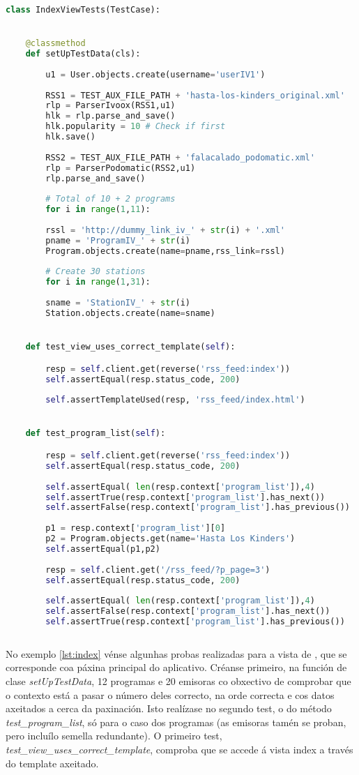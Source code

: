 \begin{lstlisting}[language=Python, caption=Fragmento das probas da vista index, label=lst:index]
class IndexViewTests(TestCase):


	@classmethod
	def setUpTestData(cls):
	
		u1 = User.objects.create(username='userIV1')
		
		RSS1 = TEST_AUX_FILE_PATH + 'hasta-los-kinders_original.xml'
		rlp = ParserIvoox(RSS1,u1)
		hlk = rlp.parse_and_save()
		hlk.popularity = 10 # Check if first
		hlk.save()
		
		RSS2 = TEST_AUX_FILE_PATH + 'falacalado_podomatic.xml'
		rlp = ParserPodomatic(RSS2,u1)
		rlp.parse_and_save()
		
		# Total of 10 + 2 programs
		for i in range(1,11):
		
		rssl = 'http://dummy_link_iv_' + str(i) + '.xml'
		pname = 'ProgramIV_' + str(i)
		Program.objects.create(name=pname,rss_link=rssl)
		
		# Create 30 stations
		for i in range(1,31):
		
		sname = 'StationIV_' + str(i)
		Station.objects.create(name=sname)


    def test_view_uses_correct_template(self):

		resp = self.client.get(reverse('rss_feed:index'))
		self.assertEqual(resp.status_code, 200)
		
		self.assertTemplateUsed(resp, 'rss_feed/index.html')


	def test_program_list(self):

		resp = self.client.get(reverse('rss_feed:index'))
		self.assertEqual(resp.status_code, 200)
		
		self.assertEqual( len(resp.context['program_list']),4)
		self.assertTrue(resp.context['program_list'].has_next())
		self.assertFalse(resp.context['program_list'].has_previous())
		
		p1 = resp.context['program_list'][0]
		p2 = Program.objects.get(name='Hasta Los Kinders')
		self.assertEqual(p1,p2)
		
		resp = self.client.get('/rss_feed/?p_page=3')
		self.assertEqual(resp.status_code, 200)
		
		self.assertEqual( len(resp.context['program_list']),4)
		self.assertFalse(resp.context['program_list'].has_next())
		self.assertTrue(resp.context['program_list'].has_previous())
	
\end{lstlisting}


No exemplo \ref{lst:index} vénse algunhas probas realizadas para a vista de , que se corresponde coa páxina principal do aplicativo. Créanse primeiro, na función de clase \textit{setUpTestData}, 12 programas e 20 emisoras co obxectivo de comprobar que o contexto está a pasar o número deles correcto, na orde correcta e cos datos axeitados a cerca da paxinación. Isto realízase no segundo test, o do método \textit{test\_program\_list}, só para o caso dos programas (as emisoras tamén se proban, pero incluílo semella redundante). O primeiro test, \textit{test\_view\_uses\_correct\_template}, comproba que se accede á vista index a través do template axeitado.


